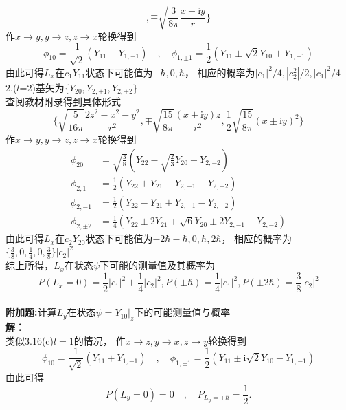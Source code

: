 \documentclass[a4paper]{article}
\begin{document}
\begin{CJK*}{UTF8}{song}
{$$        ,\mp\sqrt{\frac{3}{8\pi}}\frac{x\pm \mathrm{i}y}{r}\}$$
    \indent 作$x\rightarrow y,y\rightarrow z,z\rightarrow x$轮换得到
    $$\phi_{10}=\frac{1}{\sqrt{2}}(Y_{11}-Y_{1,-1})\quad,
        \quad\phi_{1,\pm1}=\frac{1}{2}(Y_{11}\pm \sqrt{2}Y_{10}+Y_{1,-1})$$
    \indent 由此可得$L_{x}$在$c_{1}Y_{11}$状态下可能值为$-\hbar,0,\hbar$，
        相应的概率为$|c_{1}|^{2}/4,|c_{2}^{2}|/2,|c_{1}|^{2}/4$\\
    2.($l$=2)基矢为$\{Y_{20},Y_{2,\pm1},Y_{2,\pm2}\}$\\
    \indent 查阅教材附录得到具体形式
    $$\{\sqrt{\frac{5}{16\pi}}\frac{2 z^{2}- x^{2}- y^{2}}{r^{2}}
        ,\mp\sqrt{\frac{15}{8\pi}}\frac{(x\pm \mathrm{i}y)z}{r^{2}}
        ,\frac{1}{2}\sqrt{\frac{15}{8\pi}}(x\pm \mathrm{i}y)^{2}\}$$
    \indent 作$x\rightarrow y,y\rightarrow z,z\rightarrow x$轮换得到
    \begin{equation*}\begin{split}
    \phi_{20}
        & = \sqrt{\frac{3}{8}}(Y_{22}-\sqrt{\frac{2}{3}}Y_{20}+Y_{2,-2})\\
    \phi_{2,1}
        & = \frac{1}{2}(Y_{22}+Y_{21}-Y_{2,-1}-Y_{2,-2})\\
    \phi_{2,-1}
        & = \frac{1}{2}(Y_{22}-Y_{21}+Y_{2,-1}-Y_{2,-2})\\
    \phi_{2,\pm 2}
        & = \frac{1}{4}(Y_{22}\pm2Y_{21}\mp\sqrt{6}Y_{20}\pm 2Y_{2,-1}+Y_{2,-2})
    \end{split}\end{equation*}
    \indent 由此可得$L_{x}$在$c_{2}Y_{20}$状态下可能值为$-2\hbar-\hbar,0,\hbar,2\hbar$，
        相应的概率为$\{\displaystyle\frac{3}{8},0,\frac{1}{4},0,\frac{3}{8}\}|c_{2}|^{2}$\\
    综上所得，$L_{x}$在状态$\psi$下可能的测量值及其概率为
    $$
    P(L_{x}=0)=\frac{1}{2}|c_{1}|^{2}+\frac{1}{4}|c_{2}|^{2},
        P(\pm\hbar)=\frac{1}{4}|c_{1}|^{2},P(\pm2\hbar)=\frac{3}{8}|c_{2}|^{2}
        $$
    }\\[20pt]
    \noindent \textbf{附加题:}\quad 计算$L_{y}$在状态$\psi = Y_{10}|_{z}$下的可能测量值与概率\\[8pt]
    {
    \noindent\textbf{解：}\\
    类似3.16(c)$l=1$的情况，
        作$x\rightarrow z,y\rightarrow x,z\rightarrow y$轮换得到
    $$\phi_{10}=\frac{1}{\sqrt{2}}(Y_{11}+Y_{1,-1})\quad,
        \quad\phi_{1,\pm1}=\frac{1}{2}(Y_{11}\pm \mathrm{i}\sqrt{2}Y_{10}-Y_{1,-1})$$
    由此可得
    $$P(L_{y}=0)=0\quad,\quad P_{L_{y}=\pm\hbar}=\frac{1}{2}.$$
    }\\[40pt]

\end{CJK*}
\end{document}
